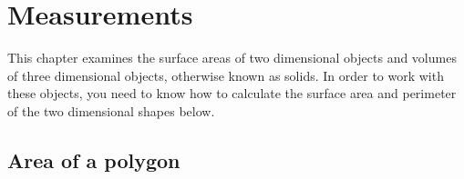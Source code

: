 
\chapter{Measurements }  
This chapter examines the surface areas of two dimensional objects and
volumes of three dimensional objects, otherwise known as solids. In
order to work with these objects, you need to know how to calculate
the surface area and perimeter of the two dimensional shapes below.\par


\section{Area of a polygon }


